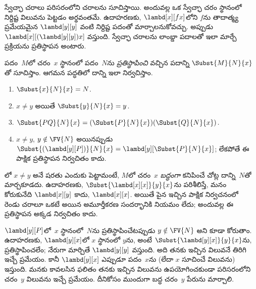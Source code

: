 \documentclass[../../../include/open-logic-section]{subfiles}
\begin{document}

\begin{explain}
స్వేచ్ఛా చరాలు పరిసరంలోని చరాలను సూచిస్తాయి. అందువల్ల ఒక స్వేచ్ఛా
చరం స్థానంలో నిర్దిష్ట విలువను పెట్టడం అర్థవంతమే. ఉదాహరణకు,
$\lambd[x][f x]$లోని $f$ను తాదాత్మ్య ప్రమేయమైన
$\lambd[y][y]$ వంటి నిర్దిష్ట పదంతో మార్చాలనుకోవచ్చు. అప్పుడు
$\lambd[x][(\lambd[y][y]) x]$ వస్తుంది. స్వేచ్ఛా చరాలను లాంబ్డా
పదాలతో ఇలా మార్చే ప్రక్రియను ప్రతిస్థాపన అంటారు.
\end{explain}

\begin{defn}[ప్రతిస్థాపన] 
  పదం~$M$లో చరం~$x$ స్థానంలో పదం~$N$ను
  \emph{ప్రతిస్థాపించి} వచ్చిన పదాన్ని $\Subst{M}{N}{x}$తో సూచిస్తాం.
  ఆగమన పద్ధతిలో దాన్ని ఇలా నిర్వచిస్తాం.
  \begin{enumerate}
    \item $\Subst{x}{N}{x} = N$. 
    \item $x \neq y$ అయితే $\Subst{y}{N}{x}  = y$.
    \item $\Subst{PQ}{N}{x}  = (\Subst{P}{N}{x}) (\Subst{Q}{N}{x})$.
    \item $x \neq y$, $y \notin \FV{N}$ అయినప్పుడు
      $\Subst{(\lambd[y][P])}{N}{x} =
      \lambd[y][\Subst{P}{N}{x}]$; లేకపోతే ఈ పాక్షిక
      ప్రతిస్థాపన నిర్వచితం కాదు.
  \end{enumerate}
\end{defn}

\begin{explain}
లో $x
\neq y$ అనే షరతు ఎందుకు పెట్టామంటే, $M$లో చరం~$x$ \emph{బద్ధంగా}
కనిపించే చోట్ల దాన్ని~$N$తో మార్చకూడదు. ఉదాహరణకు,
$\Subst{\lambd[x][x]}{y}{x}$ను పరిశీలిస్తే, మనం కోరుకునేది
$\lambd[x][y]$ కాదు, $\lambd[x][x]$. అయితే పైన ఇచ్చిన
పాక్షిక నిర్వచనంలో రెండు చరాలూ ఒకటే అయిన అమూర్తీకరణ సందర్భానికి నియమం
లేదు; అందువల్ల ఈ ప్రతిస్థాపన అక్కడ నిర్వచితం కాదు.

$\lambd[y][P]$లో~$x$ స్థానంలో~$N$ను ప్రతిస్థాపించేటప్పుడు
$y \notin \FV{N}$ అని కూడా కోరుతాం. ఉదాహరణకు,
$\lambd[y][x]$లో $x$ స్థానంలో $y$ను,
అంటే $\Subst{\lambd[y][x]}{y}{x}$ను, ప్రతిస్థాపించలేం;
నేరుగా మార్చితే $\lambd[y][y]$ వస్తుంది. అది తనకు ఇచ్చిన విలువనే
తిరిగి ఇచ్చే ప్రమేయం. కానీ $\lambd[y][x]$ ఎప్పుడూ పదం~$x$ను
(లేదా $x$ సూచించే విలువను) ఇస్తుంది. మనకు కావలసిన ఫలితం తనకు
ఇచ్చిన విలువను ఉపయోగించకుండా పరిసరంలోని చరం~$y$ విలువను ఇచ్చే
ప్రమేయం. దీనికోసం ముందుగా బద్ధ చరం~$y$ పేరును మార్చాలి.
\end{explain}
\end{document}
